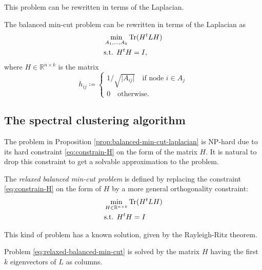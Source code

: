 \documentclass[../../main.tex]{subfiles} %
\begin{document}
This problem can be rewritten in terms of the Laplacian.
\begin{proposition}  %
The balanced min-cut problem can be rewritten in terms of the Laplacian as
\begin{equation}
	\begin{aligned}
	    &\min_{A_1, \dots, A_k} \textup{Tr} (H^t L H) \\
	    &\text{s.t. } H^t H = I,
	\end{aligned}
	\label{eq:laplacian-balanced-min-cut}
\end{equation}
where \(H \in \mathbb R^{n \times k}\) is the matrix
\begin{equation}
	h_{ij} \coloneqq \begin{cases}
		1/\sqrt{\vert A_{ij} \vert} \quad \text{if node } i \in A_j \\
		0 \quad \text{otherwise.}  
	\end{cases}
\label{eq:constrain-H}
\end{equation}
\label{prop:balanced-min-cut-laplacian}
\end{proposition}

\subsection{The spectral clustering algorithm}  %
The problem in Proposition \ref{prop:balanced-min-cut-laplacian} is NP-hard 
due to its hard constraint \eqref{eq:constrain-H} on the form of the matrix 
\(H\). It is natural to drop this constraint to get a solvable approximation to the 
problem.
\begin{definition}  %
The \textit{relaxed balanced min-cut problem} is defined by replacing the 
constraint \ref{eq:constrain-H} on the form of \(H\) by a more general 
orthogonality constraint:
	\begin{equation}
		\begin{aligned}
			&\min_{H \in \mathbb R^{n \times k}} \textup{Tr} (H^t L H) \\
			&\text{s.t. } H^t H = I
		\end{aligned}
		\label{eq:relaxed-balanced-min-cut}
	\end{equation}
\end{definition}
This kind of problem has a known solution, given by the Rayleigh-Ritz theorem.
\begin{proposition}
	Problem \eqref{eq:relaxed-balanced-min-cut} is solved by the matrix \(H\) 
	having the first \(k\) eigenvectors of \(L\) as columns.
\end{proposition}
\end{document}
